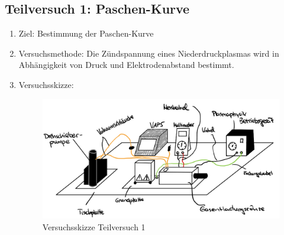 \documentclass{article}
\begin{document}
\subsection{Teilversuch 1: Paschen-Kurve}
\begin{enumerate}[label = (\Roman*)]
    \item Ziel: Bestimmung der Paschen-Kurve
    
    \item Versuchsmethode: Die Zündspannung eines Niederdruckplasmas wird in Abhängigkeit von Druck und Elektrodenabstand bestimmt.
    
    \item Versuchsskizze:
    
        \begin{figure}[H]
        \centering
        \includegraphics[width=0.7\linewidth]{Abbildungen/SkizzeTV1.jpeg}
        \caption{Versuchsskizze Teilversuch 1}
        \end{figure}


\end{enumerate}
\end{document}
